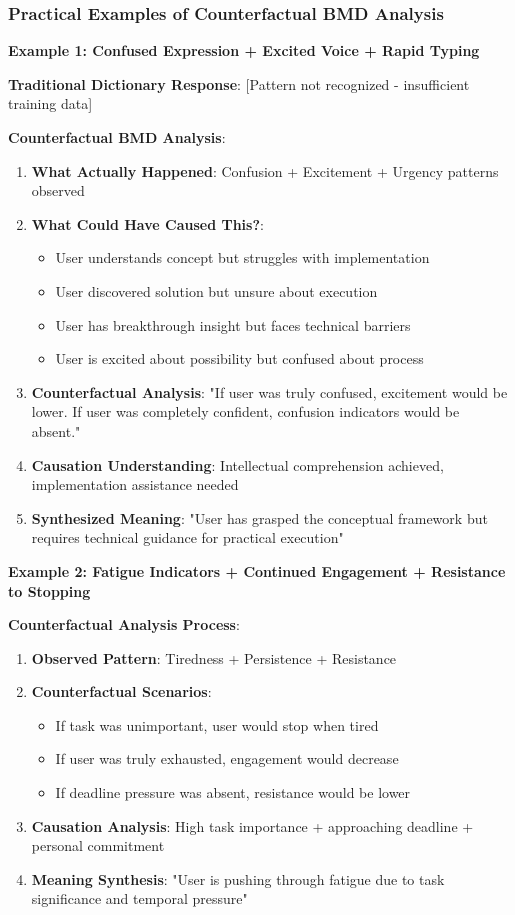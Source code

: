\documentclass[12pt,a4paper]{article}
\begin{document}
\subsubsection{Practical Examples of Counterfactual BMD Analysis}

\textbf{Example 1: Confused Expression + Excited Voice + Rapid Typing}

\textbf{Traditional Dictionary Response}: [Pattern not recognized - insufficient training data]

\textbf{Counterfactual BMD Analysis}:
\begin{enumerate}
\item \textbf{What Actually Happened}: Confusion + Excitement + Urgency patterns observed
\item \textbf{What Could Have Caused This?}:
   \begin{itemize}
   \item User understands concept but struggles with implementation
   \item User discovered solution but unsure about execution
   \item User has breakthrough insight but faces technical barriers
   \item User is excited about possibility but confused about process
   \end{itemize}
\item \textbf{Counterfactual Analysis}: "If user was truly confused, excitement would be lower. If user was completely confident, confusion indicators would be absent."
\item \textbf{Causation Understanding}: Intellectual comprehension achieved, implementation assistance needed
\item \textbf{Synthesized Meaning}: "User has grasped the conceptual framework but requires technical guidance for practical execution"
\end{enumerate}

\textbf{Example 2: Fatigue Indicators + Continued Engagement + Resistance to Stopping}

\textbf{Counterfactual Analysis Process}:
\begin{enumerate}
\item \textbf{Observed Pattern}: Tiredness + Persistence + Resistance
\item \textbf{Counterfactual Scenarios}:
   \begin{itemize}
   \item If task was unimportant, user would stop when tired
   \item If user was truly exhausted, engagement would decrease
   \item If deadline pressure was absent, resistance would be lower
   \end{itemize}
\item \textbf{Causation Analysis}: High task importance + approaching deadline + personal commitment
\item \textbf{Meaning Synthesis}: "User is pushing through fatigue due to task significance and temporal pressure"
\end{enumerate}
\end{document}
